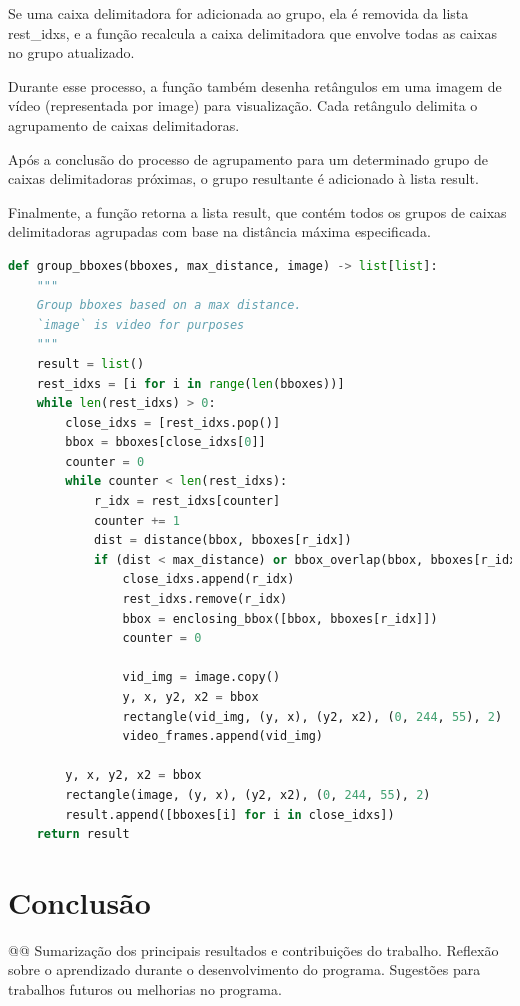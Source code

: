 \documentclass[english, 
               brazil, 
               bsc] %
               {dcomp-abntex2}
\begin{document}
Se uma caixa delimitadora for adicionada ao grupo, ela é removida da lista rest\_idxs, e a função recalcula a caixa delimitadora que envolve todas as caixas no grupo atualizado.

Durante esse processo, a função também desenha retângulos em uma imagem de vídeo (representada por image) para visualização. Cada retângulo delimita o agrupamento de caixas delimitadoras.

Após a conclusão do processo de agrupamento para um determinado grupo de caixas delimitadoras próximas, o grupo resultante é adicionado à lista result.

Finalmente, a função retorna a lista result, que contém todos os grupos de caixas delimitadoras agrupadas com base na distância máxima especificada.



\begin{codigo}[h]
  \caption{\small.}
 \label{group_bboxes}
\begin{lstlisting}[language=python]
def group_bboxes(bboxes, max_distance, image) -> list[list]:
    """
    Group bboxes based on a max distance.
    `image` is video for purposes
    """
    result = list()
    rest_idxs = [i for i in range(len(bboxes))]
    while len(rest_idxs) > 0:
        close_idxs = [rest_idxs.pop()]
        bbox = bboxes[close_idxs[0]]
        counter = 0
        while counter < len(rest_idxs):
            r_idx = rest_idxs[counter]
            counter += 1
            dist = distance(bbox, bboxes[r_idx])
            if (dist < max_distance) or bbox_overlap(bbox, bboxes[r_idx]):
                close_idxs.append(r_idx)
                rest_idxs.remove(r_idx)
                bbox = enclosing_bbox([bbox, bboxes[r_idx]])
                counter = 0

                vid_img = image.copy()
                y, x, y2, x2 = bbox
                rectangle(vid_img, (y, x), (y2, x2), (0, 244, 55), 2)
                video_frames.append(vid_img)

        y, x, y2, x2 = bbox
        rectangle(image, (y, x), (y2, x2), (0, 244, 55), 2)
        result.append([bboxes[i] for i in close_idxs])
    return result
\end{lstlisting}
\end{codigo}

\chapter{Conclusão}

@@
Sumarização dos principais resultados e contribuições do trabalho.
Reflexão sobre o aprendizado durante o desenvolvimento do programa.
Sugestões para trabalhos futuros ou melhorias no programa.









\postextual


\renewcommand{\chapnumfont}{\chaptitlefont}
\renewcommand{\afterchapternum}{}
% 
% 
\end{document}
